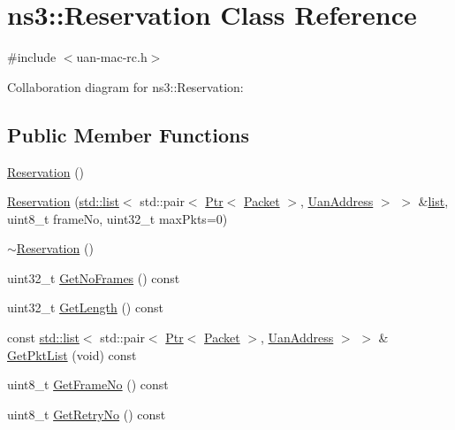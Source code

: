 \hypertarget{classns3_1_1Reservation}{}\section{ns3\+:\+:Reservation Class Reference}
\label{classns3_1_1Reservation}


{\ttfamily \#include $<$uan-\/mac-\/rc.\+h$>$}



Collaboration diagram for ns3\+:\+:Reservation\+:
\subsection*{Public Member Functions}
\begin{DoxyCompactItemize}
\item 
\hyperlink{classns3_1_1Reservation_a44ff1bd56a6c710ac9e2349d999ae86f}{Reservation} ()
\item 
\hyperlink{classns3_1_1Reservation_a602268e77258ed311d5851fd3b8ff89d}{Reservation} (\hyperlink{openflow-interface_8h_afd9bcfa176617760671b67580f536fa7}{std\+::list}$<$ std\+::pair$<$ \hyperlink{classns3_1_1Ptr}{Ptr}$<$ \hyperlink{classns3_1_1Packet}{Packet} $>$, \hyperlink{classns3_1_1UanAddress}{Uan\+Address} $>$ $>$ \&\hyperlink{openflow-interface_8h_afd9bcfa176617760671b67580f536fa7}{list}, uint8\+\_\+t frame\+No, uint32\+\_\+t max\+Pkts=0)
\item 
\hyperlink{classns3_1_1Reservation_a2ff326bd068d582a2ffabdff66a1341d}{$\sim$\+Reservation} ()
\item 
uint32\+\_\+t \hyperlink{classns3_1_1Reservation_a702e8240a4713fbde9e5cbb79341e546}{Get\+No\+Frames} () const 
\item 
uint32\+\_\+t \hyperlink{classns3_1_1Reservation_a4afdacee3ac6918fbebac1237578ec19}{Get\+Length} () const 
\item 
const \hyperlink{openflow-interface_8h_afd9bcfa176617760671b67580f536fa7}{std\+::list}$<$ std\+::pair$<$ \hyperlink{classns3_1_1Ptr}{Ptr}$<$ \hyperlink{classns3_1_1Packet}{Packet} $>$, \hyperlink{classns3_1_1UanAddress}{Uan\+Address} $>$ $>$ \& \hyperlink{classns3_1_1Reservation_a37b570e39d5b65b1536c63804c59440a}{Get\+Pkt\+List} (void) const 
\item 
uint8\+\_\+t \hyperlink{classns3_1_1Reservation_a11eb90457502a5568b763a6020b74f27}{Get\+Frame\+No} () const 
\item 
uint8\+\_\+t \hyperlink{classns3_1_1Reservation_ac79df7b744cf9d7e83bf53b6a5d06a13}{Get\+Retry\+No} () const 

\end{DoxyCompactItemize}
